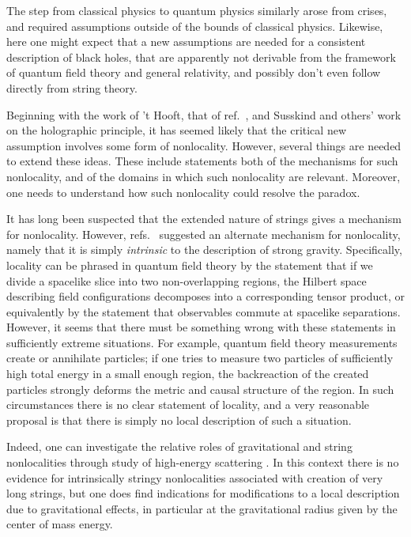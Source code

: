 
The step from classical physics to quantum physics similarly arose from crises, and required assumptions outside of the bounds of classical physics.  Likewise, here one might expect that a new assumptions are needed for a consistent description of black holes, that are apparently not derivable from the framework of quantum field theory and general relativity, and possibly don't even follow directly from string theory.

Beginning with the work of 't Hooft, that of ref.~\BHMR, and  Susskind and others' work on the holographic principle, it has seemed likely that the critical new assumption involves some form of nonlocality.  However, several things are needed to extend these ideas.  These include statements both of the mechanisms for such nonlocality, and of the domains in which such nonlocality are relevant.  Moreover, one needs to understand how such nonlocality could resolve the paradox.

It has long been suspected that the extended nature of strings gives a mechanism for nonlocality.  However, refs.~ suggested an alternate mechanism for nonlocality, namely that it is simply {\it intrinsic} to the description of strong gravity.  Specifically, locality can be phrased in quantum field theory by the statement that if we divide a spacelike slice into two non-overlapping regions, the Hilbert space describing field configurations decomposes into a corresponding tensor product, or equivalently by the statement that observables commute at spacelike separations.  However, it seems that there must be something wrong with these statements in sufficiently extreme situations.  For example, quantum field theory measurements create or annihilate particles; if one tries to measure two particles of sufficiently high total energy in a small enough region, the backreaction of the created particles strongly deforms the metric and causal structure of the region.  In such circumstances there is no clear statement of locality, and a very reasonable proposal  is that there is simply no local description of such a situation.

Indeed, one can investigate the relative roles of gravitational and string nonlocalities through study of high-energy scattering .  In this context there is no evidence for intrinsically stringy nonlocalities associated with creation of very long strings, but one does find indications for modifications to a local description due to gravitational effects,  in particular at the gravitational radius given by the center of mass energy.

